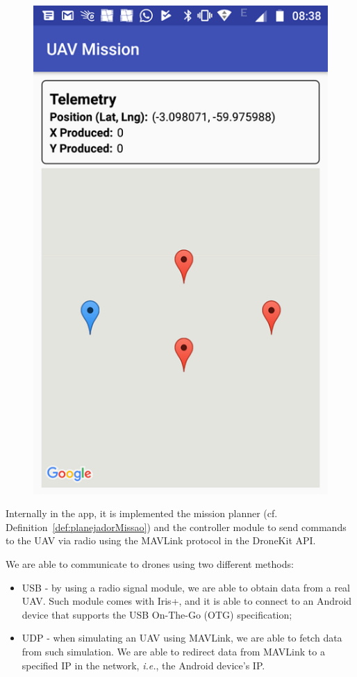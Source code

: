\documentclass[12pt]{article}
\begin{document}
\begin{figure}[]
\begin{minipage}{.55\textwidth}
  \includegraphics[width=.7\linewidth]{appSec}
  \label{fig:appSec}
\end{minipage}
\end{figure}

Internally in the app, it is implemented the mission planner (cf. Definition~\ref{def:planejadorMissao}) and the controller module to send commands to the UAV via radio using the MAVLink protocol in the DroneKit API.

We are able to communicate to drones using two different methods:
\begin{itemize}
\item USB - by using a radio signal module, we are able to obtain data from a real UAV. Such module comes with Iris+, and it is able to connect to an Android device that supports the USB On-The-Go (OTG) specification;
\item UDP - when simulating an UAV using MAVLink, we are able to fetch data from such simulation. We are able to redirect data from MAVLink to a specified IP in the network, \textit{i.e.}, the Android device's IP.
\end{itemize}
\end{document}

